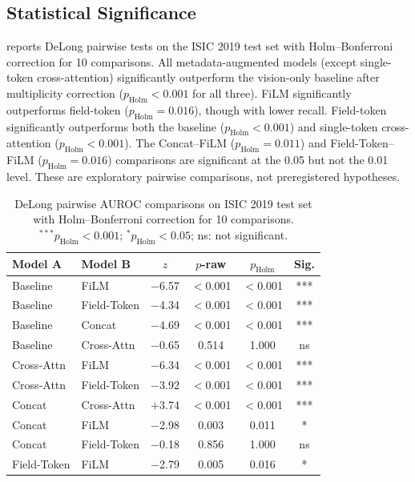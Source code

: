 \documentclass[12pt, a4paper]{article}
\begin{document}
\subsection{Statistical Significance}

 reports DeLong pairwise tests on the ISIC 2019 test set with Holm--Bonferroni correction for 10 comparisons. All metadata-augmented models (except single-token cross-attention) significantly outperform the vision-only baseline after multiplicity correction ($p_{\text{Holm}} < 0.001$ for all three). FiLM significantly outperforms field-token ($p_{\text{Holm}} = 0.016$), though with lower recall. Field-token significantly outperforms both the baseline ($p_{\text{Holm}} < 0.001$) and single-token cross-attention ($p_{\text{Holm}} < 0.001$). The Concat--FiLM ($p_{\text{Holm}} = 0.011$) and Field-Token--FiLM ($p_{\text{Holm}} = 0.016$) comparisons are significant at the 0.05 but not the 0.01 level. These are exploratory pairwise comparisons, not preregistered hypotheses.

\begin{table}[htbp]
\centering
\caption{DeLong pairwise AUROC comparisons on ISIC 2019 test set with Holm--Bonferroni correction for 10 comparisons. $^{***}p_{\text{Holm}} < 0.001$; $^{*}p_{\text{Holm}} < 0.05$; ns: not significant.}
\label{tab:delong}
\footnotesize
\begin{tabular}{llcccc}
\toprule
Model A & Model B & $z$ & $p$-raw & $p_{\text{Holm}}$ & Sig. \\
\midrule
Baseline & FiLM & $-$6.57 & $<$0.001 & $<$0.001 & *** \\
Baseline & Field-Token & $-$4.34 & $<$0.001 & $<$0.001 & *** \\
Baseline & Concat & $-$4.69 & $<$0.001 & $<$0.001 & *** \\
Baseline & Cross-Attn & $-$0.65 & 0.514 & 1.000 & ns \\
Cross-Attn & FiLM & $-$6.34 & $<$0.001 & $<$0.001 & *** \\
Cross-Attn & Field-Token & $-$3.92 & $<$0.001 & $<$0.001 & *** \\
Concat & Cross-Attn & $+$3.74 & $<$0.001 & $<$0.001 & *** \\
Concat & FiLM & $-$2.98 & 0.003 & 0.011 & * \\
Concat & Field-Token & $-$0.18 & 0.856 & 1.000 & ns \\
Field-Token & FiLM & $-$2.79 & 0.005 & 0.016 & * \\
\bottomrule
\end{tabular}
\end{table}
\end{document}
